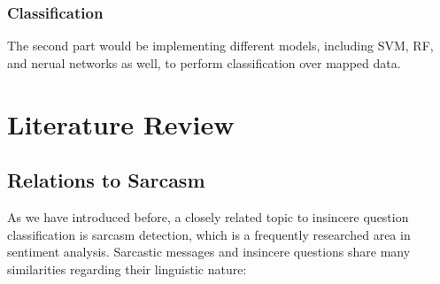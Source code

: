 \documentclass[12pt]{diazessay} %
\begin{document}
\subsubsection{Classification}

The second part would be implementing different models, including SVM, RF, and nerual networks as well, to perform classification over mapped data.


\section{Literature Review}


\subsection{Relations to Sarcasm} \label{relations-to-sarcasm}

As we have introduced before, a closely related topic to insincere question classification is sarcasm detection, which is a frequently researched area in sentiment analysis\citep{joshi2017}. Sarcastic messages and insincere questions share many similarities regarding their linguistic nature:
\end{document}
